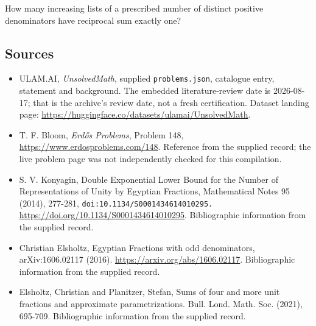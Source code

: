 \documentclass[11pt,a4paper]{article}
\begin{document}
How many increasing lists of a prescribed number of distinct positive denominators have reciprocal sum exactly one?

\subsection{Sources}

{\small

\begin{itemize}

\item[\hypertarget{source:statement:1}{S1}] ULAM.AI, \emph{UnsolvedMath}, supplied \texttt{problems.json}, catalogue entry, statement and background. The embedded literature-review date is 2026-08-17; that is the archive’s review date, not a fresh certification. Dataset landing page: \url{https://huggingface.co/datasets/ulamai/UnsolvedMath}.

\item[\hypertarget{source:statement:2}{S2}] T. F. Bloom, \emph{Erdős Problems}, Problem 148, \url{https://www.erdosproblems.com/148}. Reference from the supplied record; the live problem page was not independently checked for this compilation.

\item[\hypertarget{source:statement:3}{S3}] S. V. Konyagin, Double Exponential Lower Bound for the Number of Representations of Unity by Egyptian Fractions, Mathematical Notes 95 (2014), 277-281, \nolinkurl{doi:10.1134/S0001434614010295.} \url{https://doi.org/10.1134/S0001434614010295}. Bibliographic information from the supplied record.

\item[\hypertarget{source:statement:4}{S4}] Christian Elsholtz, Egyptian Fractions with odd denominators, arXiv:1606.02117 (2016). \url{https://arxiv.org/abs/1606.02117}. Bibliographic information from the supplied record.

\item[\hypertarget{source:statement:5}{S5}] Elsholtz, Christian and Planitzer, Stefan, Sums of four and more unit fractions and approximate parametrizations. Bull. Lond. Math. Soc. (2021), 695-709. Bibliographic information from the supplied record.

\end{itemize}

}

\label{end:statement}
\end{document}
